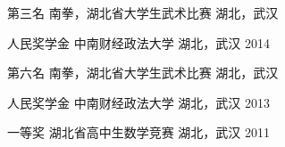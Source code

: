 \begin{cvhonors}
\cvhonor
{第三名} %
{南拳，湖北省大学生武术比赛} %
{湖北，武汉} %
{ } %


\cvhonor
{人民奖学金} %
{中南财经政法大学} %
{湖北，武汉} %
{2014} %


\cvhonor
{第六名} %
{南拳，湖北省大学生武术比赛} %
{湖北，武汉} %
{ } %


\cvhonor
{人民奖学金} %
{中南财经政法大学} %
{湖北，武汉} %
{2013} %


\cvhonor
{一等奖} %
{湖北省高中生数学竞赛} %
{湖北，武汉} %
{2011} %

\end{cvhonors}